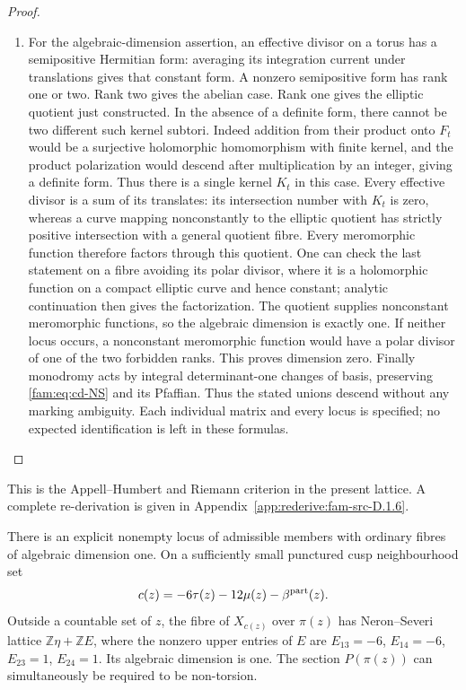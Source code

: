 \begin{proof}
\begin{enumerate}[label=\arabic*.,leftmargin=*]
\item For the algebraic-dimension assertion, an effective divisor on a torus
has a semipositive Hermitian form: averaging its integration current under
translations gives that constant form. A nonzero semipositive form has
rank one or two. Rank two gives the abelian case. Rank one gives the
elliptic quotient just constructed. In the absence of a definite form,
there cannot be two different such kernel subtori. Indeed addition from
their product onto $F_t$ would be a surjective holomorphic homomorphism
with finite kernel, and the product polarization would descend after
multiplication by an integer, giving a definite form. Thus there is a
single kernel $K_t$ in this case. Every effective divisor is a sum of
its translates: its intersection number with $K_t$ is zero, whereas a
curve mapping nonconstantly to the elliptic quotient has strictly positive
intersection with a general quotient fibre. Every meromorphic function
therefore factors through this quotient. One can check the last statement
on a fibre avoiding its polar divisor, where it is a holomorphic function
on a compact elliptic curve and hence constant; analytic continuation
then gives the factorization. The quotient supplies nonconstant
meromorphic functions, so the algebraic dimension is exactly one.
If neither locus occurs, a nonconstant meromorphic function would have
a polar divisor of one of the two forbidden ranks. This proves dimension
zero. Finally monodromy acts by integral determinant-one changes of basis,
preserving \eqref{fam:eq:cd-NS} and its Pfaffian. Thus the stated unions descend
without any marking ambiguity. Each individual matrix and every locus
is specified; no expected identification is left in these formulas.
\end{enumerate}
\end{proof}



This is the Appell--Humbert and Riemann criterion in the present lattice. A complete re-derivation is given in Appendix~\ref{app:rederive:fam-src-D.1.6}.


\begin{proposition}\hypertarget{tag-01QX}{}\label{fam:src:D.1.7}\label{fam:st:D.1.7}

There is an explicit nonempty locus of admissible members with ordinary
fibres of algebraic dimension one. On a sufficiently small punctured
cusp neighbourhood set
\[
 c(z)=-6\tau(z)-12\mu(z)-\beta^{\rm part}(z).
\]
Outside a countable set of $z$, the fibre of $X_{c(z)}$ over $\pi(z)$ has
Neron--Severi lattice $\mathbb Z\eta+\mathbb ZE$, where the nonzero upper
entries of $E$ are
$E_{13}=-6$, $E_{14}=-6$, $E_{23}=1$, $E_{24}=1$.
Its algebraic dimension is one. The section $P(\pi(z))$ can simultaneously
be required to be non-torsion.
\end{proposition}


